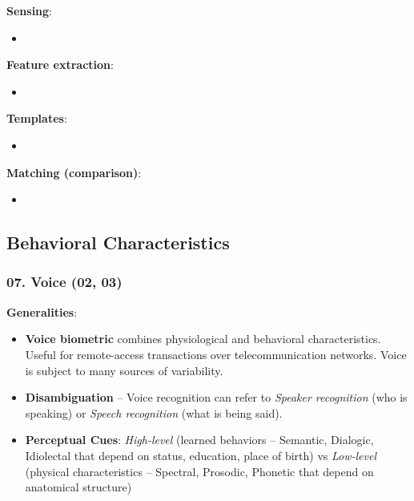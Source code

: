 \documentclass[a4paper]{article}
\begin{document}
      \textbf{Sensing}:
      \begin{itemize}
        \item 
      \end{itemize}

      \textbf{Feature extraction}:
      \begin{itemize}
        \item 
      \end{itemize}

      \textbf{Templates}:
      \begin{itemize}
        \item 
      \end{itemize}

      \textbf{Matching (comparison)}:
      \begin{itemize}
        \item 
      \end{itemize}
  \subsection*{Behavioral Characteristics}
    \subsubsection*{07. Voice (02, 03)}
      \textbf{Generalities}:
      \begin{itemize}
        \item \textbf{Voice biometric} combines physiological and behavioral characteristics. Useful for remote-access transactions over telecommunication networks. Voice is subject to many sources of variability.
        \item \textbf{Disambiguation} -- Voice recognition can refer to \emph{Speaker recognition} (who is speaking) or \emph{Speech recognition} (what is being said).
        \item \textbf{Perceptual Cues}: \emph{High-level} (learned behaviors -- Semantic, Dialogic, Idiolectal that depend on status, education, place of birth) vs \emph{Low-level} (physical characteristics -- Spectral, Prosodic, Phonetic that depend on anatomical structure)
      \end{itemize}
\end{document}
